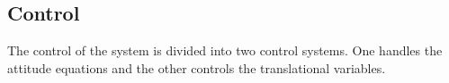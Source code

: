 \subsection{Control}
The control of the system is divided into two control systems. One handles the attitude equations and the other controls the translational variables. 